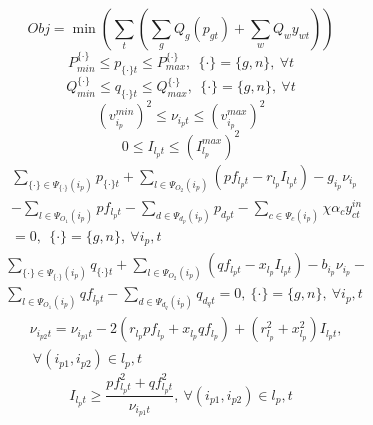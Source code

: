 \documentclass[journal]{IEEEtran}
\begin{document}
\begin{equation}\label{central_obj}
    Obj=\min(\sum_{t}(\sum_{g}Q_g(p_{gt})+\sum_{w}Q_wy_{wt}))
\end{equation}
\begin{equation}\label{active_power_capacity}
  P_{min}^{\{\cdot\}}\le p_{\{\cdot\}t} \le P_{max}^{\{\cdot\}},~~\{\cdot\}=\{g,n\},~\forall t
\end{equation}
\begin{equation}\label{reactive_capacity}
  Q_{min}^{\{\cdot\}}\le q_{\{\cdot\}t} \le Q_{max}^{\{\cdot\}},~~\{\cdot\}=\{g,n\},~\forall t
\end{equation}
\begin{equation}\label{voltage}
  (v^{min}_{i_p})^2 \le \nu_{i_pt} \le (v^{max}_{i_p})^2
\end{equation}
\begin{equation}\label{current}
  0 \le I_{l_pt} \le (I_{l_p}^{max})^2
\end{equation}
\begin{equation}
\begin{split}
\label{active_balance}
& \sum_{\{\cdot\}\in \Psi_{\{\cdot\}}(i_p)}p_{\{\cdot\}t}+\sum_{l\in \Psi_{O_2}(i_p)}(pf_{l_pt}-r_{l_p}I_{l_pt})-g_{i_p}\nu_{i_p}\\
&-\sum_{l\in\Psi_{O_1}(i_p)}pf_{l_pt}-\sum_{d\in \Psi_{d_p}(i_p)}p_{d_pt}-\sum_{c\in\Psi_c(i_p)}\chi\alpha_cy_{ct}^{in}\\
&=0,~~\{\cdot\}=\{g,n\},~\forall i_p,t
\end{split}
\end{equation}
\begin{equation}
\begin{split}
\label{reactive_balance}
&\sum_{\{\cdot\}\in \Psi_{\{\cdot\}}(i_p)}q_{\{\cdot\}t}+\sum_{l\in \Psi_{O_2}(i_p)}(qf_{l_pt}-x_{l_p}I_{l_pt})-b_{i_p}\nu_{i_p}-\\
&\sum_{l\in\Psi_{O_1}(i_p)}qf_{l_pt}-\sum_{d\in \Psi_{d_q}(i_p)}q_{d_qt}=0,~\{\cdot\}=\{g,n\},~\forall i_p,t
\end{split}
\end{equation}
\begin{equation}\label{voltage_decreament}
\begin{split}
&\nu_{i_{p2}t}=\nu_{i_{p1}t}-2(r_{l_p}pf_{l_p}+x_{l_p}qf_{l_p})+(r_{l_p}^2+x_{l_p}^2)I_{l_pt},\\
&~\forall (i_{p1},i_{p2})\in l_p, t
\end{split}
\end{equation}
\begin{equation}\label{Apparent_Power}
  I_{l_pt} \ge \frac{pf_{l_pt}^2+qf_{l_pt}^2}{\nu_{i_{p1}t}},~\forall (i_{p1},i_{p2})\in l_p, t
\end{equation}
\end{document}
